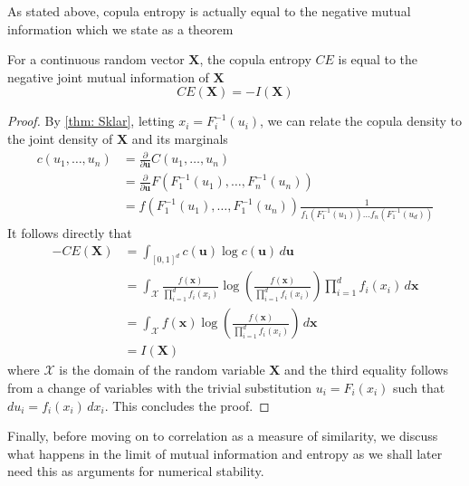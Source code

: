 \documentclass[../Thesis.tex]{subfiles}
\begin{document}
As stated above, copula entropy is actually equal to the negative mutual information which we state as a theorem
\begin{theorem}\label{thm:copula entropy equals mutual information}
    For a continuous random vector $\boldsymbol{X}$, the copula entropy $CE$ is equal to the negative joint mutual information of $\boldsymbol{X}$
    $$CE\left(\boldsymbol{X}\right) = - I\left(\boldsymbol{X}\right)$$
\end{theorem}
\begin{proof}
    By \autoref{thm: Sklar}, letting $x_i = F_i^{-1}\left(u_i\right)$, we can relate the copula density to the joint density of $\boldsymbol{X}$ and its marginals
    \begin{align*}
        c(u_1,\dots , u_n) & = \frac{\partial}{\partial \mathbf{u}} C(u_1,\dots,u_n)                                                                                                                   \\
                           & = \frac{\partial}{\partial \mathbf{u}} F\left(F_1^{-1}\left(u_1\right), \dots, F_n^{-1}\left(u_n\right)\right)                                                            \\
                           & = f\left(F_1^{-1}\left(u_1\right),\dots, F_1^{-1}\left(u_n\right)\right) \frac{1}{f_1\left(F_1^{-1}\left(u_1\right)\right)\dots f_n\left(F_1^{-1}\left(u_d\right)\right)}
    \end{align*}
    It follows directly that
    \begin{align*}
        -CE\left(\boldsymbol{X}\right) & = \int_{[0,1]^d} c\left(\boldsymbol{u}\right) \log c\left(\boldsymbol{u}\right) \, d\boldsymbol{u}                                                                                                                        \\
                                       & =  \int_{\mathcal{X}} \frac{f(\boldsymbol{x})}{\prod_{i=1}^{d} f_i\left(x_i\right)} \log\left(\frac{f(\boldsymbol{x})}{\prod_{i=1}^{d} f_i\left(x_i\right)}\right) \prod_{i=1}^{d} f_i\left(x_i\right) \, d\boldsymbol{x} \\
                                       & = \int_{\mathcal{X}} f(\boldsymbol{x}) \log\left(\frac{f(\boldsymbol{x})}{\prod_{i=1}^{d} f_i\left(x_i\right)}\right) \, d\boldsymbol{x}                                                                                  \\
                                       & = I\left(\boldsymbol{X}\right)
    \end{align*}
    where $\mathcal{X}$ is the domain of the random variable $\boldsymbol X$ and the third equality follows from a change of variables with the trivial substitution $u_i = F_i(x_i)$ such that $du_i = f_i(x_i)\,dx_i$. This concludes the proof.
\end{proof}
Finally, before moving on to correlation as a measure of similarity, we discuss what happens in the limit of mutual information and entropy as we shall later need this as arguments for numerical stability.
\end{document}
